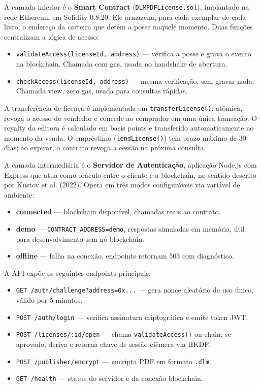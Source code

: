 \documentclass[12pt]{article}
\begin{document}
A camada inferior é o \textbf{Smart Contract} (\texttt{DLMPDFLicense.sol}), implantado na rede Ethereum em Solidity 0.8.20. Ele armazena, para cada exemplar de cada livro, o endereço da carteira que detém a posse naquele momento. Duas funções centralizam a lógica de acesso:

\begin{itemize}
    \item \texttt{validateAccess(licenseId, address)} — verifica a posse e grava o evento na blockchain. Chamada com gas, usada no handshake de abertura.
    \item \texttt{checkAccess(licenseId, address)} — mesma verificação, sem gravar nada. Chamada view, zero gas, usada para consultas rápidas.
\end{itemize}

A transferência de licença é implementada em \texttt{transferLicense()}: atômica, revoga o acesso do vendedor e concede ao comprador em uma única transação. O royalty da editora é calculado em basis points e transferido automaticamente no momento da venda. O empréstimo (\texttt{lendLicense()}) tem prazo máximo de 30 dias; ao expirar, o contrato revoga a cessão na próxima consulta.

A camada intermediária é o \textbf{Servidor de Autenticação}, aplicação Node.js com Express que atua como oráculo entre o cliente e a blockchain, no sentido descrito por Kustov et al. (2022). Opera em três modos configuráveis via variável de ambiente:

\begin{itemize}
    \item \textbf{connected} — blockchain disponível, chamadas reais ao contrato.
    \item \textbf{demo} — \texttt{CONTRACT\_ADDRESS=demo}, respostas simuladas em memória, útil para desenvolvimento sem nó blockchain.
    \item \textbf{offline} — falha na conexão, endpoints retornam 503 com diagnóstico.
\end{itemize}

A API expõe os seguintes endpoints principais:

\begin{itemize}
    \item \texttt{GET /auth/challenge?address=0x...} — gera nonce aleatório de uso único, válido por 5 minutos.
    \item \texttt{POST /auth/login} — verifica assinatura criptográfica e emite token JWT.
    \item \texttt{POST /licenses/:id/open} — chama \texttt{validateAccess()} on-chain; se aprovado, deriva e retorna chave de sessão efêmera via HKDF.
    \item \texttt{POST /publisher/encrypt} — encripta PDF em formato \texttt{.dlm}.
    \item \texttt{GET /health} — status do servidor e da conexão blockchain.
\end{itemize}
\end{document}
